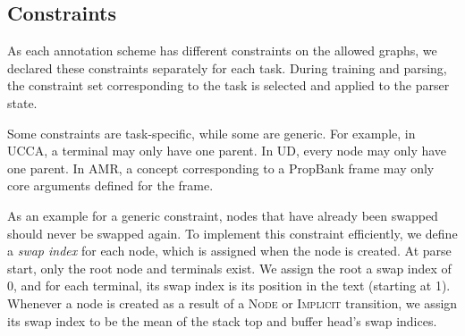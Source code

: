 \documentclass[11pt,a4paper]{article}
\begin{document}
\subsection{Constraints}

As each annotation scheme has different constraints on the allowed graphs,
we declared these constraints separately for each task.
During training and parsing, the constraint set corresponding to the task is
selected and applied to the parser state.

Some constraints are task-specific, while some are generic.
For example, in UCCA, a terminal may only have one parent.
In UD, every node may only have one parent.
In AMR, a concept corresponding to a PropBank frame may only core arguments defined for the frame.

As an example for a generic constraint, nodes that have already been swapped
should never be swapped again.
To implement this constraint efficiently, we define a \textit{swap index}
for each node, which is assigned when the node is created.
At parse start, only the root node and terminals exist.
We assign the root a swap index of 0, and for each terminal, its swap index
is its position in the text (starting at 1).
Whenever a node is created as a result of a \textsc{Node} or \textsc{Implicit}
transition, we assign its swap index to be the mean of the stack top and buffer
head's swap indices.
\end{document}
